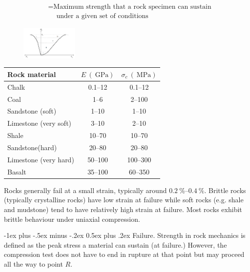\documentclass[10pt,landscape,a4paper]{article}
\makeatletter
\renewcommand{\section}{\@startsection{section}{1}{0mm}%
	{-1ex plus -.5ex minus -.2ex}%
	{0.5ex plus .2ex}%
	{\normalfont\large\bfseries}}
\makeatother
\begin{document}
\begin{multicols}{3}
\begin{align*}
		                     & = \text{Maximum strength that a rock specimen can sustain} \\
		                     & \quad \ \text{under a given set of conditions}
	\end{align*}
	\begin{figure}[H]
		\centering
		\includegraphics[width=0.25\textwidth]{unconfined-uniaxial}
	\end{figure}
	\begin{table}[H]\scriptsize\centering\begin{tabular}{l c c}
			Rock material         & $E \ (\SI{}{\giga\pascal})$ & $\sigma_c \ (\SI{}{\mega\pascal})$ \\
			\hline
			Chalk                 & \SIrange{0.1}{12}{}         & \SIrange{0.1}{12}{}                \\
			Coal                  & \SIrange{1}{6}{}            & \SIrange{2}{100}{}                 \\
			Sandstone (soft)      & \SIrange{1}{10}{}           & \SIrange{1}{10}{}                  \\
			Limestone (very soft) & \SIrange{3}{10}{}           & \SIrange{2}{10}{}                  \\
			Shale                 & \SIrange{10}{70}{}          & \SIrange{10}{70}{}                 \\
			Sandstone(hard)       & \SIrange{20}{80}{}          & \SIrange{20}{80}{}                 \\
			Limestone (very hard) & \SIrange{50}{100}{}         & \SIrange{100}{300}{}               \\
			Basalt                & \SIrange{35}{100}{}         & \SIrange{60}{350}{}
		\end{tabular}\end{table}
	Rocks generally fail at a small strain, typically around $\SIrange{0.2}{0.4}{\percent}$.
	Brittle rocks (typically crystalline rocks) have low strain at failure while soft rocks (e.g. shale and mudstone) tend to have relatively high strain at failure.
	Most rocks exhibit brittle behaviour under uniaxial compression.
	
	\section{Failure.}
	Strength in rock mechanics is defined as the peak stress a material can sustain (at failure.)
	However, the compression test does not have to end in rupture at that point but may proceed all the way to point $R$.
	

\end{multicols}
\end{document}
